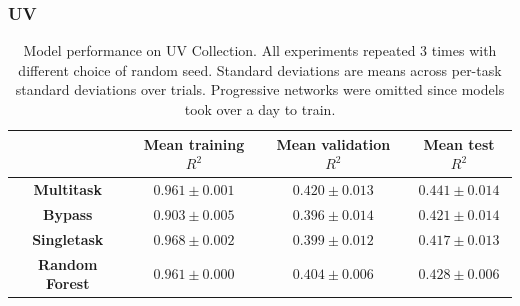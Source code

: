 \subsubsection{UV}
\begin{table}[h]
    \centering
    \begin{tabular}{ |c|c|c|c| } 
    \hline
     & Mean training $R^2$ & Mean validation $R^2$ & Mean test $R^2$ \\
    \hline
    \textbf{Multitask} & $0.961 \pm 0.001$ & $0.420 \pm 0.013$ & $0.441 \pm 0.014$  \\
    \hline
    \textbf{Bypass} & $0.903 \pm 0.005$ & $0.396 \pm 0.014$ & $0.421 \pm 0.014$  \\
    \hline
    \textbf{Singletask} & $0.968 \pm 0.002$ & $0.399 \pm 0.012$ & $0.417 \pm 0.013$ \\
    \hline
    \textbf{Random Forest} & $0.961 \pm 0.000$ & $0.404 \pm 0.006$ & $0.428 \pm 0.006$  \\
    \hline
    \end{tabular}
    \caption{Model performance on UV Collection. All experiments repeated 3 times with different choice of random seed. Standard deviations are means across per-task standard deviations over trials. Progressive networks were omitted since models took over a day to train.}
    \label{tab:uv}
\end{table}

